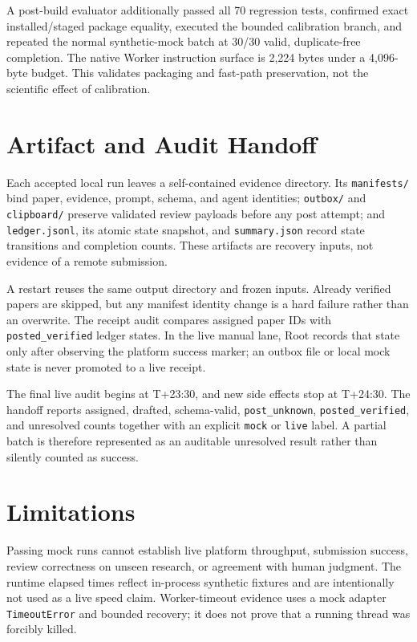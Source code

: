\documentclass{article}
\begin{document}
A post-build evaluator additionally passed all 70 regression tests, confirmed
exact installed/staged package equality, executed the bounded calibration
branch, and repeated the normal synthetic-mock batch at 30/30 valid,
duplicate-free completion. The native
Worker instruction surface is 2,224 bytes under a 4,096-byte budget. This
validates packaging and fast-path preservation, not the scientific effect of
calibration.

\section{Artifact and Audit Handoff}

Each accepted local run leaves a self-contained evidence directory. Its
\texttt{manifests/} bind paper, evidence, prompt, schema, and agent identities;
\texttt{outbox/} and \texttt{clipboard/} preserve validated review payloads
before any post attempt; and \texttt{ledger.jsonl}, its atomic state snapshot,
and \texttt{summary.json} record state transitions and completion counts. These
artifacts are recovery inputs, not evidence of a remote submission.

A restart reuses the same output directory and frozen inputs. Already verified
papers are skipped, but any manifest identity change is a hard failure rather
than an overwrite. The receipt audit compares assigned paper IDs with
\texttt{posted\_verified} ledger states. In the live manual lane, Root records
that state only after observing the platform success marker; an outbox file or
local mock state is never promoted to a live receipt.

The final live audit begins at T+23:30, and new side effects stop at T+24:30.
The handoff reports assigned, drafted, schema-valid, \texttt{post\_unknown},
\texttt{posted\_verified}, and unresolved counts together with an explicit
\texttt{mock} or \texttt{live} label. A partial batch is therefore represented
as an auditable unresolved result rather than silently counted as success.

\section{Limitations}

Passing mock runs cannot establish live platform throughput, submission
success, review correctness on unseen research, or agreement with human
judgment. The runtime elapsed times reflect in-process synthetic fixtures and
are intentionally not used as a live speed claim. Worker-timeout evidence uses
a mock adapter \texttt{TimeoutError} and bounded recovery; it does not prove
that a running thread was forcibly killed.
\end{document}
